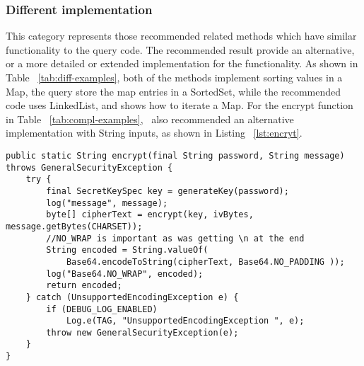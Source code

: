 \subsubsection{Different implementation} This category represents those recommended related methods which have similar functionality to the query code. The recommended result provide an alternative, or a more detailed or extended implementation for the functionality. As shown in Table ~\ref{tab:diff-examples}, both of the methods implement sorting values in a {\ttt Map}, the query store the map entries in a {\ttt SortedSet}, while the recommended code uses {\ttt LinkedList}, and shows how to iterate a {\ttt Map}. For the {\ttt encrypt} function in Table ~\ref{tab:compl-examples}, \tool\ also recommended an alternative implementation with {\ttt String} inputs, as shown in Listing ~\ref{lst:encryt}.


\begin{lstlisting}[caption={different implementation for \texttt{encrypt}}, label={lst:encryt}]
public static String encrypt(final String password, String message) throws GeneralSecurityException {
	try {
		final SecretKeySpec key = generateKey(password);
		log("message", message);
		byte[] cipherText = encrypt(key, ivBytes, message.getBytes(CHARSET));
		//NO_WRAP is important as was getting \n at the end
		String encoded = String.valueOf(
			Base64.encodeToString(cipherText, Base64.NO_PADDING ));
		log("Base64.NO_WRAP", encoded);
		return encoded;
	} catch (UnsupportedEncodingException e) {
		if (DEBUG_LOG_ENABLED)
			Log.e(TAG, "UnsupportedEncodingException ", e);
		throw new GeneralSecurityException(e);
	}
}
\end{lstlisting}



